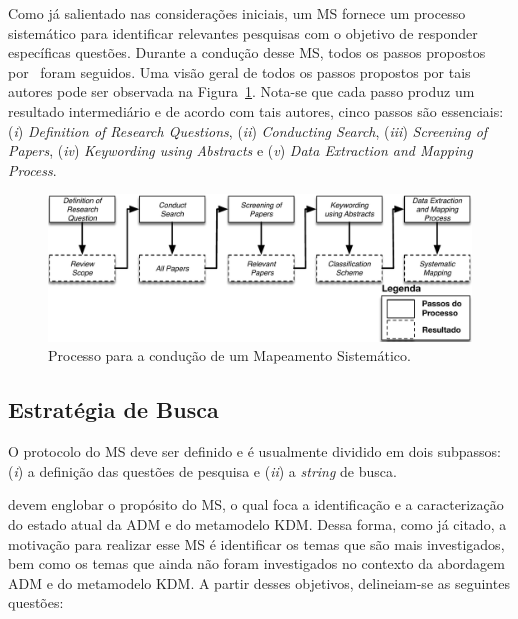 Como já salientado nas considerações iniciais, um MS fornece um processo sistemático para identificar relevantes pesquisas com o objetivo de responder específicas questões. Durante a condução desse MS, todos os passos propostos por~ foram seguidos. Uma visão geral de todos os passos propostos por tais autores pode ser observada na Figura~\ref{fig:all_steps_MS}. Nota-se que cada passo produz um resultado intermediário e de acordo com tais autores, cinco passos são essenciais: (\textit{i}) \textit{Definition of Research Questions}, (\textit{ii}) \textit{Conducting Search}, (\textit{iii}) \emph{Screening of Papers}, (\textit{iv}) \emph{Keywording using Abstracts} e (\textit{v}) \textit{Data Extraction and Mapping Process}. 

\begin{figure}[h]
 \caption{Processo para a condução de um Mapeamento Sistemático.}
 \label{fig:all_steps_MS}
 \centering
 \includegraphics[scale=0.7]{images/SystematicProcessSteps_new_day_21_01}
\end{figure}

\subsection{Estratégia de Busca}\label{subsec:estrategia_de_busca}

O protocolo do MS deve ser definido e é usualmente dividido em dois subpassos: (\textit{i}) a definição das questões de pesquisa e (\textit{ii}) a \textit{string} de busca. 

 devem englobar o propósito do MS, o qual foca a identificação e a caracterização do estado atual da ADM e do metamodelo KDM. Dessa forma, como já citado, a motivação para realizar esse MS é identificar os temas que são mais investigados, bem como os temas que ainda não foram investigados no contexto da abordagem ADM e do metamodelo KDM. A partir desses objetivos, delineiam-se as seguintes questões:

